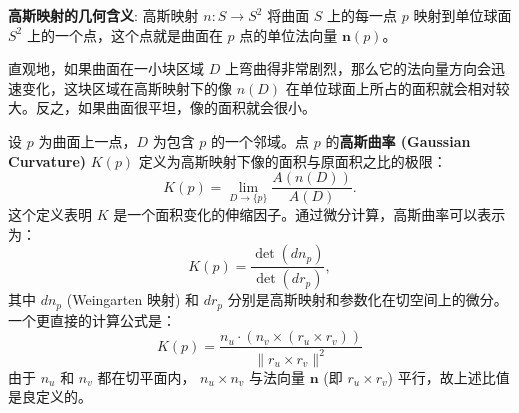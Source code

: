 \documentclass[lang=cn,10pt,thmcnt=section]{elegantbook}
\renewcommand{\vec}[1]{\mathbf{#1}}
\begin{document}
\noindent\textbf{高斯映射的几何含义}:
高斯映射 $n: S \to S^2$ 将曲面 $S$ 上的每一点 $p$ 映射到单位球面 $S^2$ 上的一个点，这个点就是曲面在 $p$ 点的单位法向量 $\vec{n}(p)$。

直观地，如果曲面在一小块区域 $D$ 上弯曲得非常剧烈，那么它的法向量方向会迅速变化，这块区域在高斯映射下的像 $n(D)$ 在单位球面上所占的面积就会相对较大。反之，如果曲面很平坦，像的面积就会很小。

\begin{definition}[高斯曲率]
    设 $p$ 为曲面上一点，$D$ 为包含 $p$ 的一个邻域。点 $p$ 的\textbf{高斯曲率 (Gaussian Curvature)} $K(p)$ 定义为高斯映射下像的面积与原面积之比的极限：
    \[
    K(p) = \lim_{D \to \{p\}} \frac{A(n(D))}{A(D)}.
    \]
    这个定义表明 $K$ 是一个面积变化的伸缩因子。通过微分计算，高斯曲率可以表示为：
    \[
    K(p) = \frac{\det(d n_p)}{\det(d r_p)},
    \]
    其中 $d n_p$ (Weingarten 映射) 和 $d r_p$ 分别是高斯映射和参数化在切空间上的微分。一个更直接的计算公式是：
    \[ K(p) = \frac{n_u \cdot (n_v \times (r_u \times r_v))}{\|r_u \times r_v\|^2} \]
    由于 $n_u$ 和 $n_v$ 都在切平面内， $n_u \times n_v$ 与法向量 $\vec{n}$ (即 $r_u \times r_v$) 平行，故上述比值是良定义的。
\end{definition}
\end{document}
